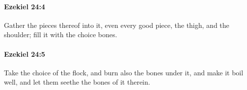		\paragraph{Ezekiel 24:4} %
			\label{EZEKIEL-24-4}

			Gather the pieces thereof into it, even every good piece, the thigh, and the shoulder; fill it with the choice bones.


		\paragraph{Ezekiel 24:5} %
			\label{EZEKIEL-24-5}

			Take the choice of the flock, and burn also the bones under it, and make it boil well, and let them seethe the bones of it therein.


